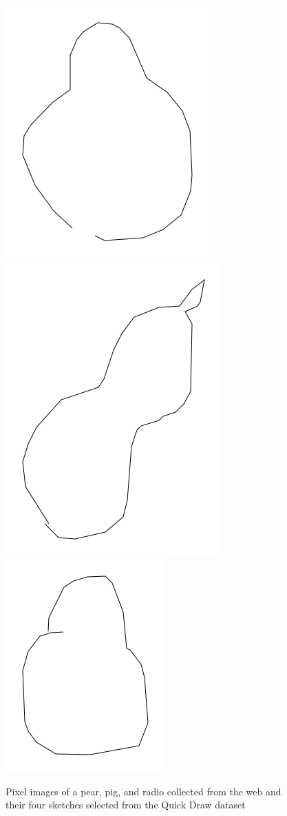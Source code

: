 \documentclass{article}
\begin{document}
\begin{figure}[h]
\includegraphics[scale=0.15]{images/pear00039.png}
\includegraphics[scale=0.1]{images/pear00111.png}
\includegraphics[scale=0.15]{images/pear00239.png}\\
\caption{Pixel images of a pear, pig, and radio collected from the web and their four sketches selected from the Quick Draw dataset \cite{quickdraw}}
\end{figure}
\end{document}

